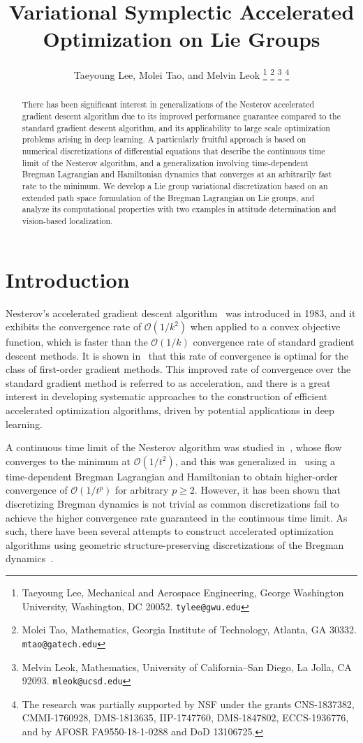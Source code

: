 \documentclass[letterpaper, 10pt, conference]{ieeeconf}
\title{\LARGE \bf Variational Symplectic Accelerated Optimization on Lie Groups}
\author{%
    Taeyoung Lee, Molei Tao, and Melvin Leok%
    \thanks{Taeyoung Lee, Mechanical and Aerospace Engineering, George Washington University, Washington, DC 20052. {\tt tylee@gwu.edu}}%
    \thanks{Molei Tao, Mathematics, Georgia Institute of Technology, Atlanta, GA 30332. {\tt mtao@gatech.edu}}
    \thanks{Melvin Leok, Mathematics, University of California--San Diego, La Jolla, CA 92093. {\tt mleok@ucsd.edu}}
    \thanks{The research was partially supported by NSF under the grants CNS-1837382, CMMI-1760928, DMS-1813635, IIP-1747760, DMS-1847802, ECCS-1936776, and by AFOSR FA9550-18-1-0288 and DoD 13106725.}
}
\begin{document}
\allowdisplaybreaks

\maketitle \thispagestyle{empty} \pagestyle{empty}

\begin{abstract}
There has been significant interest in generalizations of the Nesterov accelerated gradient descent algorithm due to its improved performance guarantee compared to the standard gradient descent algorithm, and its applicability to large scale optimization problems arising in deep learning.
A particularly fruitful approach is based on numerical discretizations of differential equations that describe the continuous time limit of the Nesterov algorithm, and a generalization involving time-dependent Bregman Lagrangian and Hamiltonian dynamics that converges at an arbitrarily fast rate to the minimum.
We develop a Lie group variational discretization based on an extended path space formulation of the Bregman Lagrangian on Lie groups, and analyze its computational properties with two examples in attitude determination and vision-based localization.  
\end{abstract}

\section{Introduction}

Nesterov's accelerated gradient descent algorithm~\cite{Nes83} was introduced in 1983, and it exhibits the convergence rate of $\mathcal{O}(1/k^2)$ when applied to a convex objective function, which is faster than the $\mathcal{O}(1/k)$ convergence rate of standard gradient descent methods.
It is shown in~\cite{nesterov2003introductory} that this rate of convergence is optimal for the class of first-order gradient methods.
This improved rate of convergence over the standard gradient method is referred to as acceleration, and there is a great interest in developing systematic approaches to the construction of efficient accelerated optimization algorithms, driven by potential applications in deep learning.

A continuous time limit of the Nesterov algorithm was studied in~\cite{su2016differential}, whose flow converges to the minimum at $\mathcal{O}(1/t^2)$, and this was generalized in~\cite{wibisono2016variational} using a time-dependent Bregman Lagrangian and Hamiltonian to obtain higher-order convergence of $\mathcal{O}(1/t^p)$ for arbitrary $p\geq 2$.
However, it has been shown that discretizing Bregman dynamics is not trivial as common discretizations fail to achieve the higher convergence rate guaranteed in the continuous time limit.
As such, there have been several attempts to construct accelerated optimization algorithms using geometric structure-preserving discretizations of the Bregman dynamics~\cite{betancourt2018symplectic}. 
\end{document}
